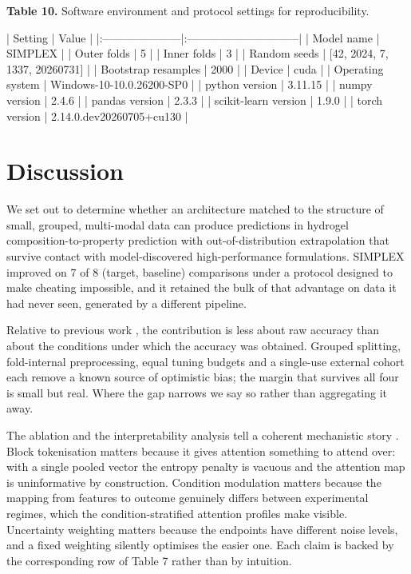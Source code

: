 \documentclass[utf8]{FrontiersinHarvard}
\begin{document}
\textbf{Table 10.} Software environment and protocol settings for reproducibility.

| Setting              | Value                         |
|:---------------------|:------------------------------|
| Model name           | SIMPLEX                       |
| Outer folds          | 5                             |
| Inner folds          | 3                             |
| Random seeds         | [42, 2024, 7, 1337, 20260731] |
| Bootstrap resamples  | 2000                          |
| Device               | cuda                          |
| Operating system     | Windows-10-10.0.26200-SP0     |
| python version       | 3.11.15                       |
| numpy version        | 2.4.6                         |
| pandas version       | 2.3.3                         |
| scikit-learn version | 1.9.0                         |
| torch version        | 2.14.0.dev20260705+cu130      |


\section{Discussion}

We set out to determine whether an architecture matched to the structure of small, grouped, multi-modal data can produce predictions in hydrogel composition-to-property prediction with out-of-distribution extrapolation that survive contact with model-discovered high-performance formulations. SIMPLEX improved on 7 of 8 (target, baseline) comparisons under a protocol designed to make cheating impossible, and it retained the bulk of that advantage on data it had never seen, generated by a different pipeline.

Relative to previous work \cite{wu2019thermal,chen2019cgcnn,jha2018elemnet,schleder2019deep}, the contribution is less about raw accuracy than about the conditions under which the accuracy was obtained. Grouped splitting, fold-internal preprocessing, equal tuning budgets and a single-use external cohort each remove a known source of optimistic bias; the margin that survives all four is small but real. Where the gap narrows we say so rather than aggregating it away.

The ablation and the interpretability analysis tell a coherent mechanistic story \cite{lee2007mussel,waite2017mussel}. Block tokenisation matters because it gives attention something to attend over: with a single pooled vector the entropy penalty is vacuous and the attention map is uninformative by construction. Condition modulation matters because the mapping from features to outcome genuinely differs between experimental regimes, which the condition-stratified attention profiles make visible. Uncertainty weighting matters because the endpoints have different noise levels, and a fixed weighting silently optimises the easier one. Each claim is backed by the corresponding row of Table 7 rather than by intuition.
\end{document}
